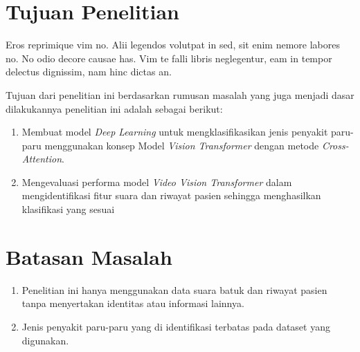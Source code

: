 \section{Tujuan Penelitian}
Eros reprimique vim no. Alii legendos volutpat in sed, sit enim nemore labores no. No odio decore causae has. Vim te falli libris neglegentur, eam in tempor delectus dignissim, nam hinc dictas an.

Tujuan dari penelitian ini berdasarkan rumusan masalah yang juga menjadi dasar dilakukannya penelitian ini adalah sebagai berikut:
\begin{enumerate}
        \item 
        Membuat model \textit{Deep Learning} untuk mengklasifikasikan jenis penyakit paru-paru menggunakan konsep Model \textit{Vision Transformer} dengan metode \textit{Cross-Attention}.
        \item
        Mengevaluasi performa model \textit{Video Vision Transformer} dalam mengidentifikasi fitur suara dan riwayat pasien sehingga menghasilkan klasifikasi yang sesuai
\end{enumerate}

\section{Batasan Masalah}

\begin{enumerate}
        \item 
        Penelitian ini hanya menggunakan data suara batuk dan riwayat pasien tanpa menyertakan identitas atau informasi lainnya.
        \item
        Jenis penyakit paru-paru yang di identifikasi terbatas pada dataset yang digunakan.
\end{enumerate}
